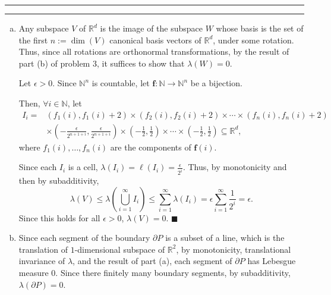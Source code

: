 \documentclass[11pt]{article}
\newcounter{questionCounter}
\newcounter{partCounter}[questionCounter]
\newenvironment{question}[2][\arabic{questionCounter}]{%
    \setcounter{partCounter}{0}%
    \vspace{.25in} \hrule \vspace{0.5em}%
        \noindent{\bf #2}%
    \vspace{0.8em} \hrule \vspace{.10in}%
    \addtocounter{questionCounter}{1}%
}{}
\renewcommand{\qed}{\quad $\blacksquare$}
\newcommand{\bff}{\mathbf{f}}
\begin{document}
\begin{question}{Problem 2}
\begin{enumerate}[(a)]
\item Any subspace $V$ of $\mathbb{R}^d$ is the image of the subspace $W$
whose basis is the set of the first $n := \dim(V)$ canonical basis vectors of
$\mathbb{R}^d$, under some rotation. Thus, since all rotations are
orthonormal transformations, by the result of part (b) of problem 3, it
suffices to show that $\lambda(W) = 0$.

Let $\epsilon > 0$. Since $\mathbb{N}^n$ is countable, let
$\bff: \mathbb{N} \rightarrow \mathbb{N}^n$ be a bijection.

Then, $\forall i \in \mathbb{N}$, let
\begin{align*}
I_i = 
&        (f_1(i),f_1(i) + 2)
  \times (f_2(i),f_2(i) + 2)
  \times \cdots
  \times (f_n(i),f_n(i) + 2)                                              \\
& \times \left(-\frac{\epsilon}{2^{n + 1 + i}},
                                    \frac{\epsilon}{2^{n + 1 + i}}\right)
  \times \left(-\frac12,\frac12\right)
  \times \cdots
  \times \left(-\frac12,\frac12\right)
\subseteq \mathbb{R}^d,
\end{align*}
where $f_1(i),\ldots,f_n(i)$ are the components of $\bff(i)$.

Since each $I_i$ is a cell, $\lambda(I_i) = \ell(I_i) = \frac{\epsilon}{2^i}$.
Thus, by monotonicity and then by subadditivity,
\[\lambda(V)
 \leq \lambda\left(\bigcup_{i = 1}^{\infty} I_i \right)
 \leq                 \sum_{i = 1}^{\infty} \lambda(I_i)
 =    \epsilon        \sum_{i = 1}^{\infty} \frac{1}{2^i}
 = \epsilon.
\]
Since this holds for all $\epsilon > 0$, $\lambda(V) = 0$. \qed

\item
Since each segment of the boundary $\partial P$ is a subset of a line, which
is the translation of $1$-dimensional subspace of
$\mathbb{R}^2$, by monotonicity, translational invariance of $\lambda$, and
the result of part (a), each segment of $\partial P$ has Lebesgue measure $0$.
Since there finitely many boundary segments, by subadditivity,
$\lambda(\partial P) = 0$.


\end{enumerate}
\end{question}
\end{document}
